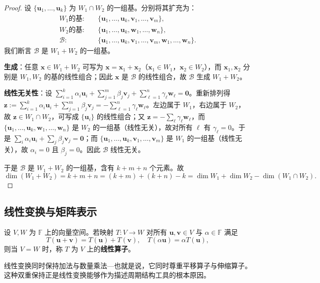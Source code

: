 \begin{proof}
设 $\{\mathbf{u}_1, \dots, \mathbf{u}_k\}$ 为 $W_1 \cap W_2$ 的一组基。分别将其扩充为：
\[
\begin{aligned}
W_1\text{的基}:&\quad \{\mathbf{u}_1, \dots, \mathbf{u}_k, \mathbf{v}_1, \dots, \mathbf{v}_m\}, \\
W_2\text{的基}:&\quad \{\mathbf{u}_1, \dots, \mathbf{u}_k, \mathbf{w}_1, \dots, \mathbf{w}_n\}, \\
\mathcal{B}:&\quad \{\mathbf{u}_1, \dots, \mathbf{u}_k, \mathbf{v}_1, \dots, \mathbf{v}_m, \mathbf{w}_1, \dots, \mathbf{w}_n\}.
\end{aligned}
\]
我们断言 $\mathcal{B}$ 是 $W_1 + W_2$ 的一组基。

\textbf{生成}：任意 $\mathbf{x} \in W_1 + W_2$ 可写为 $\mathbf{x} = \mathbf{x}_1 + \mathbf{x}_2$（$\mathbf{x}_1 \in W_1$，$\mathbf{x}_2 \in W_2$），而 $\mathbf{x}_1, \mathbf{x}_2$ 分别是 $W_1, W_2$ 的基的线性组合；因此 $\mathbf{x}$ 是 $\mathcal{B}$ 的线性组合，故 $\mathcal{B}$ 生成 $W_1 + W_2$。

\textbf{线性无关性}：设 $\sum_{i=1}^k \alpha_i \mathbf{u}_i + \sum_{j=1}^m \beta_j \mathbf{v}_j + \sum_{\ell=1}^n \gamma_\ell \mathbf{w}_\ell = \mathbf{0}$。重新排列得 $\mathbf{z} := \sum_{i=1}^k \alpha_i \mathbf{u}_i + \sum_{j=1}^m \beta_j \mathbf{v}_j = -\sum_{\ell=1}^n \gamma_\ell \mathbf{w}_\ell$。左边属于 $W_1$，右边属于 $W_2$，故 $\mathbf{z} \in W_1 \cap W_2$，可写成 $\{\mathbf{u}_i\}$ 的线性组合；又 $\mathbf{z} = -\sum_{\ell} \gamma_\ell \mathbf{w}_\ell$，而 $\{\mathbf{u}_1, \dots, \mathbf{u}_k, \mathbf{w}_1, \dots, \mathbf{w}_n\}$ 是 $W_2$ 的一组基（线性无关），故对所有 $\ell$ 有 $\gamma_\ell = 0$。于是 $\sum_i \alpha_i \mathbf{u}_i + \sum_j \beta_j \mathbf{v}_j = \mathbf{0}$；而 $\{\mathbf{u}_1, \dots, \mathbf{u}_k, \mathbf{v}_1, \dots, \mathbf{v}_m\}$ 是 $W_1$ 的一组基（线性无关），故 $\alpha_i = 0$ 且 $\beta_j = 0$。因此 $\mathcal{B}$ 线性无关。

于是 $\mathcal{B}$ 是 $W_1 + W_2$ 的一组基，含有 $k + m + n$ 个元素。故
\[
\dim(W_1 + W_2) = k + m + n = (k+m) + (k+n) - k = \dim W_1 + \dim W_2 - \dim(W_1 \cap W_2).
\]
\end{proof}

\subsection{\texorpdfstring{线性变换与矩阵表示}{线性变换与矩阵表示}}

\begin{definition}[线性变换]\label{def:linear_transformation}
设 $V, W$ 为 $\mathbb{F}$ 上的向量空间。若映射 $T: V \to W$ 对所有 $\mathbf{u}, \mathbf{v} \in V$ 与 $\alpha \in \mathbb{F}$ 满足
\[
T(\mathbf{u} + \mathbf{v}) = T(\mathbf{u}) + T(\mathbf{v}), \quad T(\alpha \mathbf{u}) = \alpha T(\mathbf{u}),
\]
则当 $V = W$ 时，称 $T$ 为 $V$ 上的\textbf{线性算子}。

线性变换同时保持加法与数量乘法---也就是说，它同时尊重平移算子与伸缩算子。这种双重保持正是线性变换能够作为描述周期结构工具的根本原因。
\end{definition}

